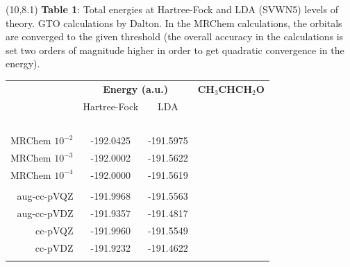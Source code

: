\documentclass[a0,portrait]{a0poster}
\begin{document}
\begin{textblock}{7}(10,8.1)
\footnotesize
\textbf{Table 1}: Total energies at Hartree-Fock and LDA (SVWN5) levels of theory. GTO
calculations by Dalton\cite{Dalton}. In the MRChem calculations, the orbitals are converged 
to the given threshold (the overall accuracy in the calculations is set two orders of magnitude
higher in order to get quadratic convergence in the energy).  
\begin{table}
    \normalsize
    \centering
    \begin{tabular}{|r|cc|cc|}
\hline                   &\multicolumn{2}{c|}{\textbf{Energy (a.u.)}}
						 &\multicolumn{2}{c|}{\textbf{CH$_3$CHCH$_2$O}}\\

                         &Hartree-Fock   &LDA        &               &               \\
\hline  \hspace{55mm}\   &\hspace{62mm}\ &\hspace{62mm}\ &\hspace{62mm}\ &\hspace{62mm}\ \\
	MRChem $10^{-2}$ & -192.0425     & -191.5975     &               &               \\
	MRChem $10^{-3}$ & -192.0002     & -191.5622     &               &               \\
	MRChem $10^{-4}$ & -192.0000     & -191.5619     &               &               \\
	                 &               &               &               &               \\
    aug-cc-pVQZ      & -191.9968     & -191.5563     &               &               \\
	aug-cc-pVDZ      & -191.9357     & -191.4817     &               &               \\
	    cc-pVQZ      & -191.9960     & -191.5549     &               &               \\
	    cc-pVDZ      & -191.9232     & -191.4622     &               &               \\
	                 &               &               &               &               \\
\hline
	\end{tabular}
    \end{table}
\end{textblock}
\end{document}
